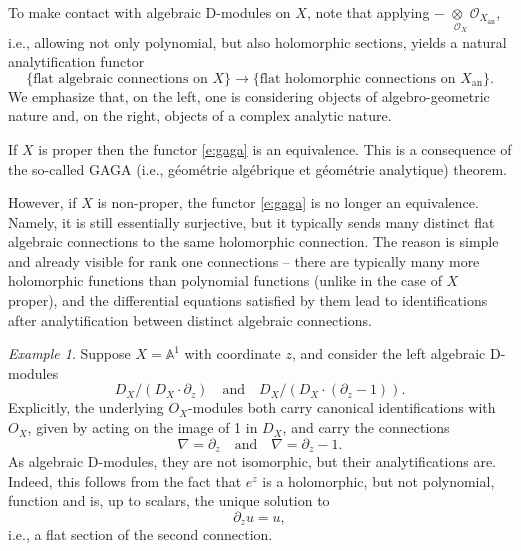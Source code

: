 \documentclass[10pt]{amsart}
\newcommand{\on}{\operatorname}
\theoremstyle{remark}
\newtheorem{ex}[subsubsection]{Example}
\newcommand{\OO}{\mathscr{O}}
\numberwithin{equation}{section}
\begin{document}
	\subsubsection{} 
	To make contact with algebraic D-modules on $X$, note that applying $- 
	\underset{\phantom{ii}\OO_{X}}{\otimes} \OO_{X_{\on{an}}}$, i.e., allowing not only polynomial, but also holomorphic sections, yields a natural 
	analytification functor 
	\begin{equation} \label{e:gaga}
	\{ \text{flat algebraic connections on $X$} \} \rightarrow \{  \text{flat 
	holomorphic connections on $X_{\on{an}}$} \}. 
	\end{equation}
	We emphasize that, on the left, one is considering objects of algebro-geometric nature and, on the right, objects of a complex analytic nature. 
	
	If $X$ is proper then the functor \eqref{e:gaga} is an equivalence. This 
	is a consequence of the so-called GAGA (i.e., g\'{e}om\'etrie alg\'ebrique 
	et g\'eom\'etrie analytique) theorem.
	
	However, if $X$ is non-proper, the functor \eqref{e:gaga} is no longer an equivalence. Namely, it is still essentially surjective, but it typically sends many 
	distinct flat algebraic connections to the same holomorphic connection. The 
	reason is simple and already visible for rank one connections -- there are 
	typically many more holomorphic functions than polynomial functions (unlike 
	in the case of $X$ proper), and the differential equations satisfied by them lead to identifications after analytification between distinct algebraic connections. 
	
	\begin{ex}Suppose $X = \mathbb{A}^1$ with coordinate $z$, and consider the 
	left algebraic D-modules 
		\[
		D_X / (D_X \cdot \partial_z) \quad \text{and} \quad  D_X / (D_X \cdot 
		(\partial_z - 1)).
		\]
		Explicitly, the underlying $O_X$-modules both carry canonical identifications 
		with $O_X$, given by acting on the image of 1 in $D_X$, and carry the 
		connections 
		\[
		\nabla =  \partial_z \quad \text{and} \quad \nabla = \partial_z - 1. 
		\]
		As algebraic D-modules, they are not isomorphic, but their 
		analytifications are. Indeed, this follows from the fact that $e^z$ is 
		a holomorphic, but not polynomial, function and is, up to scalars, the 
		unique solution to 
		\[
		\partial_z u = u, 
		\]
		i.e., a flat section of the second connection. 
	\end{ex}
	
\end{document}

